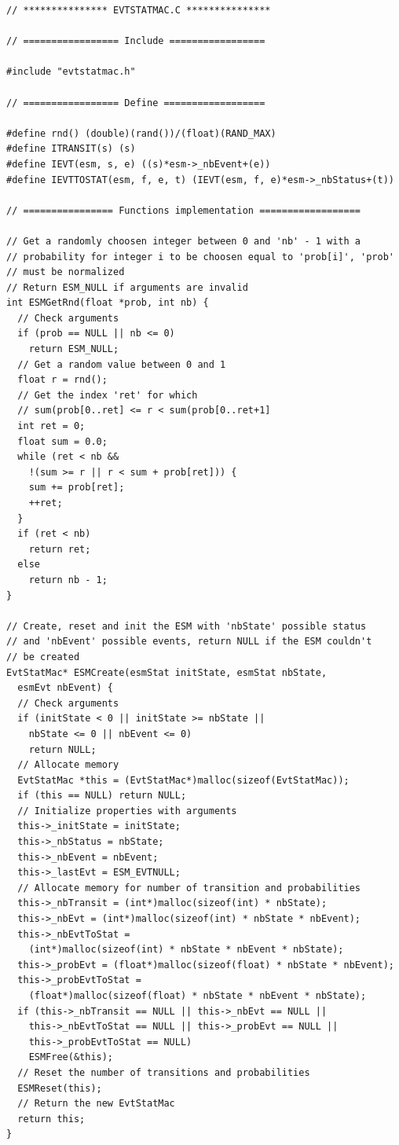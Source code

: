 \documentclass[12pt, a4paper]{article}
\begin{document}
\begin{scriptsize}
\begin{ttfamily}
\begin{lstlisting}
// *************** EVTSTATMAC.C ***************

// ================= Include =================

#include "evtstatmac.h"

// ================= Define ==================

#define rnd() (double)(rand())/(float)(RAND_MAX)
#define ITRANSIT(s) (s)
#define IEVT(esm, s, e) ((s)*esm->_nbEvent+(e))
#define IEVTTOSTAT(esm, f, e, t) (IEVT(esm, f, e)*esm->_nbStatus+(t))

// ================ Functions implementation ==================

// Get a randomly choosen integer between 0 and 'nb' - 1 with a 
// probability for integer i to be choosen equal to 'prob[i]', 'prob' 
// must be normalized
// Return ESM_NULL if arguments are invalid
int ESMGetRnd(float *prob, int nb) {
  // Check arguments
  if (prob == NULL || nb <= 0) 
    return ESM_NULL;
  // Get a random value between 0 and 1
  float r = rnd();
  // Get the index 'ret' for which 
  // sum(prob[0..ret] <= r < sum(prob[0..ret+1]
  int ret = 0;
  float sum = 0.0;
  while (ret < nb && 
    !(sum >= r || r < sum + prob[ret])) {
    sum += prob[ret];
    ++ret;
  }
  if (ret < nb)
    return ret;
  else 
    return nb - 1;
}

// Create, reset and init the ESM with 'nbState' possible status 
// and 'nbEvent' possible events, return NULL if the ESM couldn't 
// be created 
EvtStatMac* ESMCreate(esmStat initState, esmStat nbState, 
  esmEvt nbEvent) {
  // Check arguments
  if (initState < 0 || initState >= nbState ||
    nbState <= 0 || nbEvent <= 0) 
    return NULL;
  // Allocate memory
  EvtStatMac *this = (EvtStatMac*)malloc(sizeof(EvtStatMac));
  if (this == NULL) return NULL;
  // Initialize properties with arguments
  this->_initState = initState;
  this->_nbStatus = nbState;
  this->_nbEvent = nbEvent;
  this->_lastEvt = ESM_EVTNULL;
  // Allocate memory for number of transition and probabilities
  this->_nbTransit = (int*)malloc(sizeof(int) * nbState);
  this->_nbEvt = (int*)malloc(sizeof(int) * nbState * nbEvent);
  this->_nbEvtToStat = 
    (int*)malloc(sizeof(int) * nbState * nbEvent * nbState);
  this->_probEvt = (float*)malloc(sizeof(float) * nbState * nbEvent);
  this->_probEvtToStat = 
    (float*)malloc(sizeof(float) * nbState * nbEvent * nbState);
  if (this->_nbTransit == NULL || this->_nbEvt == NULL || 
    this->_nbEvtToStat == NULL || this->_probEvt == NULL || 
    this->_probEvtToStat == NULL)
    ESMFree(&this);
  // Reset the number of transitions and probabilities
  ESMReset(this);
  // Return the new EvtStatMac
  return this;
}


\end{lstlisting}
\end{ttfamily}
\end{scriptsize}
\end{document}
